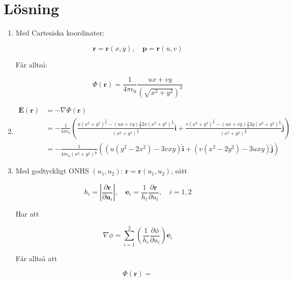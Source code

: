 \documentclass{article}
\renewcommand{\vec}[1]{\mathbf{#1}}
\begin{document}
\section*{Lösning}
\begin{enumerate}
	\item Med Cartesiska koordinater:

		$$ \vec r = \vec r(x, y), \quad \vec p = \vec r(u, v) $$

		Får alltså:

		$$ \Phi(\vec r) = \frac1{4\pi\epsilon_0} \frac{ux + vy}{(\sqrt{x^2 + y^2})^3} $$

	\item

		\begin{equation*}
		\begin{split}
			\vec E(\vec r) &= -\nabla \Phi(\vec r) \\
			&= -\frac1{4\pi\epsilon_0} \left(
			\frac{u (x^2 + y^2)^\frac32 - (ux + vy) \frac32 2x (x^2 + y^2)^\frac12}{(x^2 + y^2)^\frac62} \vec{\hat{i}}
			+ \frac{v (x^2 + y^2)^\frac32 - (ux + vy) \frac32 2y (x^2 + y^2)^\frac12}{(x^2 + y^2)^\frac62} \vec{\hat{j}}
			\right) \\
			&= -\frac1{4\pi\epsilon_0 (x^2 + y^2)^\frac52} \left(
			(u (y^2 - 2x^2) - 3vxy) \vec{\hat{i}}
			+ (v (x^2 - 2y^2) - 3uxy) \vec{\hat{j}}
			\right)
		\end{split}
		\end{equation*}

	\item Med godtyckligt ONHS $(u_1, u_2)$: $\vec r = \vec r(u_1, u_2)$, sätt

		$$ h_i = \left\lvert \frac{\partial \vec r}{\partial \vec u_i} \right\rvert, \quad
		\vec e_i = \frac1{h_i} \frac{\partial \vec r}{\partial u_i}, \quad i = 1, 2 $$

		Har att

		$$ \nabla \phi = \sum_{i=1}^2 \left(\frac1{h_i} \frac{\partial \phi}{\partial u_i}\right) \vec e_i $$

		Får alltså att

		$$ \Phi(\vec r) = $$
\end{enumerate}
\end{document}
